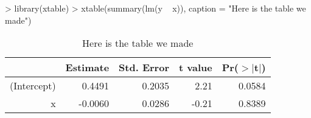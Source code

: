 \documentclass[12pt]{article}         %
\begin{document}
\begin{Schunk}
\begin{Sinput}
> library(xtable)
> xtable(summary(lm(y ~ x)), caption = "Here is the table we made")
\end{Sinput}
% latex table generated in R 2.15.1 by xtable 1.7-0 package
% Fri Jul 13 07:53:37 2012
\begin{table}[ht]
\begin{center}
\begin{tabular}{rrrrr}
  \hline
 & Estimate & Std. Error & t value & Pr($>$$|$t$|$) \\ 
  \hline
(Intercept) & 0.4491 & 0.2035 & 2.21 & 0.0584 \\ 
  x & -0.0060 & 0.0286 & -0.21 & 0.8389 \\ 
   \hline
\end{tabular}
\caption{Here is the table we made}
\end{center}
\end{table}\end{Schunk}
\end{document}
